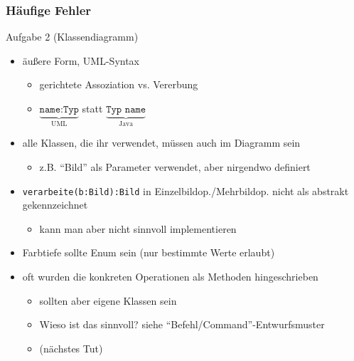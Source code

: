 \documentclass[18pt]{beamer}
\begin{document}
\begin{frame}
		\frametitle{Häufige Fehler}
		\begin{block}{Aufgabe 2 (Klassendiagramm)}
			\begin{itemize}
				\item äußere Form, UML-Syntax
				\begin{itemize}
					\item gerichtete Assoziation vs. Vererbung
					\item $\underbrace{\texttt{name:Typ}}_{\text{UML}}$ statt $\underbrace{\texttt{Typ name}}_{\text{Java}}$
				\end{itemize}
				\pause
				\item alle Klassen, die ihr verwendet, müssen auch im Diagramm sein
				\begin{itemize}
					\item z.B. \enquote{Bild} als Parameter verwendet, aber nirgendwo definiert
				\end{itemize}
				\pause
				\item \texttt{verarbeite(b:Bild):Bild} in Einzelbildop./Mehrbildop. nicht als abstrakt gekennzeichnet
				\begin{itemize}
					\item kann man aber nicht sinnvoll implementieren
				\end{itemize}
				\pause
				\item Farbtiefe sollte Enum sein (nur bestimmte Werte erlaubt)
				\pause
				\item oft wurden die konkreten Operationen als Methoden hingeschrieben
				\begin{itemize}
					\item sollten aber eigene Klassen sein
					\item Wieso ist das sinnvoll? siehe \enquote{Befehl/Command}-Entwurfsmuster 
					\item (nächstes Tut)
				\end{itemize}
			\end{itemize}
		\end{block}
\end{frame}
\end{document}
